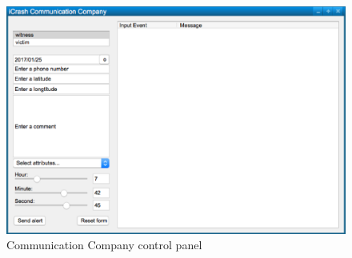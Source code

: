\begin{figure}
  \centering
    \includegraphics[width=12cm]{images/mockups/feature2-access-rights/CommunicationCompany.eps}
  \caption{Communication Company control panel}
  \label{fig:CommunicationCompanyControlPanel}
\end{figure}
